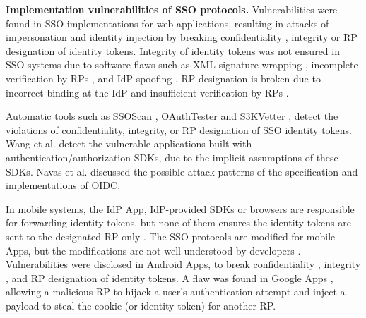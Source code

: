 \vspace{1mm}
\noindent\textbf{Implementation vulnerabilities of SSO protocols.}
Vulnerabilities were found in SSO implementations for web applications,
    resulting in attacks of impersonation and identity injection
     by breaking confidentiality \cite{WangCW12,ccsSunB12,ArmandoCCCPS13,DiscoveringJCS,dimvaLiM16}, integrity \cite{WangCW12,SomorovskyMSKJ12,WangZLG16,MainkaMS16, MainkaMSW17,dimvaLiM16} or RP designation \cite{WangZLG16,MainkaMS16,MainkaMSW17,YangLCZ18,dimvaLiM16} of identity tokens.
Integrity of identity tokens was not ensured in SSO systems  \cite{SomorovskyMSKJ12,WangCW12,WangZLG16,MainkaMS16, MainkaMSW17}
due to software flaws such as XML signature wrapping \cite{SomorovskyMSKJ12},
 incomplete verification by RPs \cite{WangCW12,WangZLG16,MainkaMSW17}, and IdP spoofing \cite{MainkaMS16,MainkaMSW17}.
RP designation is broken
    due to incorrect binding at the IdP \cite{YangLCZ18,WangZLG16} and insufficient verification by RPs \cite{MainkaMS16,MainkaMSW17,YangLCZ18}.

Automatic tools such as SSOScan \cite{ZhouE14}, OAuthTester \cite{YangLLZH16} and S3KVetter \cite{YangLCZ18},
detect the violations of confidentiality, integrity, or RP designation of SSO identity tokens.
Wang et al. \cite{ExplicatingSDK} detect the vulnerable applications
    built with authentication/authorization SDKs,
     due to the implicit assumptions of these SDKs.
Navas et al. \cite{NavasB19} discussed the possible attack patterns of the specification and implementations of OIDC.

In mobile systems,
the IdP App,
    IdP-provided SDKs %
     or browsers
         are responsible for forwarding identity tokens, %
but none of them ensures the identity tokens are sent to the designated RP only \cite{ChenPCTKT14,WangZLLYLG15}.
The SSO protocols are modified for mobile Apps, but the modifications are not well understood by developers \cite{ChenPCTKT14,YangLS17}.
Vulnerabilities were disclosed in Android Apps,
    to break confidentiality \cite{ChenPCTKT14,WangZLLYLG15,YangLS17,ShiWL19}, integrity \cite{ChenPCTKT14,YangLS17}, and RP designation \cite{ChenPCTKT14,ShiWL19} of identity tokens.
A flaw was found in Google Apps \cite{ArmandoCCCPS13}, allowing a malicious RP to hijack a user's authentication attempt and inject a payload to steal the cookie (or identity token) for another RP.

